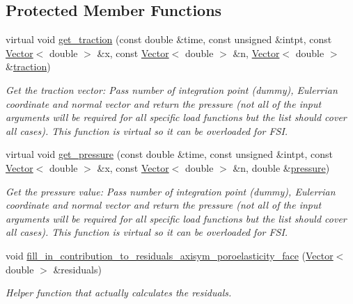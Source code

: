\subsection*{Protected Member Functions}
\begin{DoxyCompactItemize}
\item 
virtual void \hyperlink{classoomph_1_1AxisymmetricPoroelasticityTractionElement_a0d996e2947fe74e991d1f382cfa5491d}{get\+\_\+traction} (const double \&time, const unsigned \&intpt, const \hyperlink{classoomph_1_1Vector}{Vector}$<$ double $>$ \&x, const \hyperlink{classoomph_1_1Vector}{Vector}$<$ double $>$ \&n, \hyperlink{classoomph_1_1Vector}{Vector}$<$ double $>$ \&\hyperlink{classoomph_1_1AxisymmetricPoroelasticityTractionElement_abb8e937540df8384b6129793497f1e50}{traction})
\begin{DoxyCompactList}\small\item\em Get the traction vector\+: Pass number of integration point (dummy), Eulerrian coordinate and normal vector and return the pressure (not all of the input arguments will be required for all specific load functions but the list should cover all cases). This function is virtual so it can be overloaded for F\+SI. \end{DoxyCompactList}\item 
virtual void \hyperlink{classoomph_1_1AxisymmetricPoroelasticityTractionElement_a1b4adcf0b886054a3d51e0b2910ddbda}{get\+\_\+pressure} (const double \&time, const unsigned \&intpt, const \hyperlink{classoomph_1_1Vector}{Vector}$<$ double $>$ \&x, const \hyperlink{classoomph_1_1Vector}{Vector}$<$ double $>$ \&n, double \&\hyperlink{classoomph_1_1AxisymmetricPoroelasticityTractionElement_a9d0a69336be18e1a62450c5c8872777b}{pressure})
\begin{DoxyCompactList}\small\item\em Get the pressure value\+: Pass number of integration point (dummy), Eulerrian coordinate and normal vector and return the pressure (not all of the input arguments will be required for all specific load functions but the list should cover all cases). This function is virtual so it can be overloaded for F\+SI. \end{DoxyCompactList}\item 
void \hyperlink{classoomph_1_1AxisymmetricPoroelasticityTractionElement_a98e47ba16813ca8024932544a4b00e87}{fill\+\_\+in\+\_\+contribution\+\_\+to\+\_\+residuals\+\_\+axisym\+\_\+poroelasticity\+\_\+face} (\hyperlink{classoomph_1_1Vector}{Vector}$<$ double $>$ \&residuals)
\begin{DoxyCompactList}\small\item\em Helper function that actually calculates the residuals. \end{DoxyCompactList}\end{DoxyCompactItemize}
